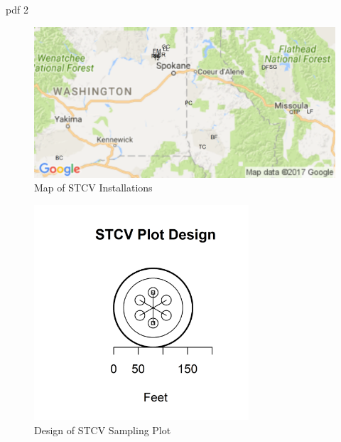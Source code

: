 \documentclass[11pt, letterpaper, fleqn]{article}
\begin{document}
\begin{Schunk}
\begin{Soutput}
pdf 
  2 
\end{Soutput}
\end{Schunk}

\begin{figure}[ht]
\begin{center}
    \includegraphics[width=.8\textwidth]{inst_map.png}
    \caption{Map of STCV Installations}
    \label{fig:map}
\end{center}
\end{figure}




\begin{figure}[h]
\begin{center}
\includegraphics[width=80mm]{sampleplot}
\caption{Design of STCV Sampling Plot}
\label{fig:design}
\end{center}
\end{figure}
\end{document}
